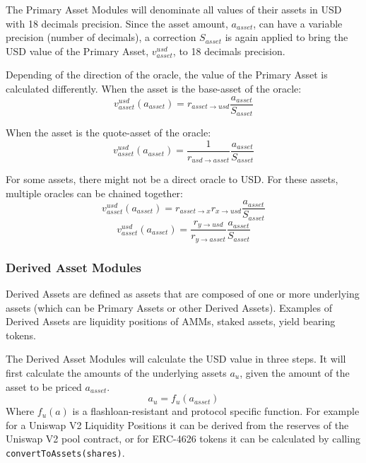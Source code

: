 \documentclass[sigconf,nonacm]{acmart}
\begin{document}
The Primary Asset Modules will denominate all values of their assets in USD with 18 decimals precision.
Since the asset amount, $a_{asset}$, can have a variable precision (number of decimals),
a correction $S_{asset}$ is again applied to bring the USD value of the Primary Asset, $v_{asset}^{usd}$, to 18 decimals precision.

Depending of the direction of the oracle, the value of the Primary Asset is calculated differently.
When the asset is the base-asset of the oracle:
\begin{equation}
    v^{usd}_{asset}(a_{asset}) = r_{asset\rightarrow usd} \frac{a_{asset}}{S_{asset}}
\end{equation}

When the asset is the quote-asset of the oracle:
\begin{equation}
    v^{usd}_{asset}(a_{asset}) = \frac{1}{r_{usd\rightarrow asset}} \frac{a_{asset}}{S_{asset}}
\end{equation}

For some assets, there might not be a direct oracle to USD.
For these assets, multiple oracles can be chained together:
\begin{equation}
    v^{usd}_{asset}(a_{asset}) = r_{asset\rightarrow x} r_{x\rightarrow usd} \frac{a_{asset}}{S_{asset}}
\end{equation}
\begin{equation}
    v^{usd}_{asset}(a_{asset}) = \frac{r_{y\rightarrow usd}}{r_{y\rightarrow asset}} \frac{a_{asset}}{S_{asset}}
\end{equation}

\subsubsection{Derived Asset Modules}
Derived Assets are defined as assets that are composed of one or more underlying assets (which can be Primary Assets or other Derived Assets).
Examples of Derived Assets are liquidity positions of AMMs, staked assets, yield bearing tokens.

The Derived Asset Modules will calculate the USD value in three steps.
It will first calculate the amounts of the underlying assets $a_{u}$, given the amount of the asset to be priced $a_{asset}$.
\begin{equation}
    \label{eq:underlying-asset-amounts}
    a_{u} = f_{u}(a_{asset})
\end{equation}
Where $f_{u}(a)$ is a flashloan-resistant and protocol specific function.
For example for a Uniswap V2 Liquidity Positions it can be derived from the reserves of the Uniswap V2 pool contract,
or for ERC-4626 tokens it can be calculated by calling \texttt{convertToAssets(shares)}.
\end{document}
